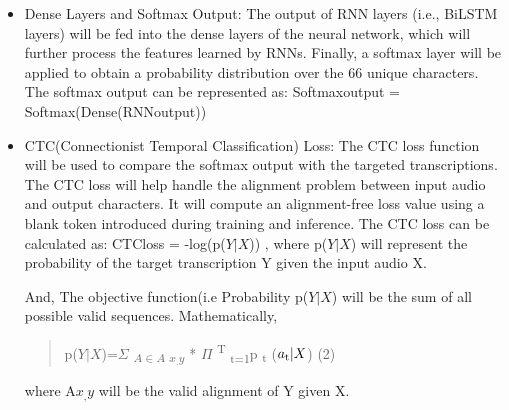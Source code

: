 \begin{enumerate}
\begin{itemize}
\item   Dense Layers and Softmax Output: The output of RNN layers (i.e., BiLSTM layers) will be fed into the dense layers of the neural network, which will further process the features learned by RNNs. Finally, a softmax layer will be applied to obtain a probability distribution over the 66 unique characters. The softmax output can be represented as:
Softmax\textunderscore output = Softmax(Dense(RNN\textunderscore output))
\item  CTC(Connectionist Temporal Classification) Loss: The CTC loss function will be used to compare the softmax output with the targeted transcriptions. The CTC loss will help handle the alignment problem between input audio and output characters. It will compute an alignment-free loss value using a blank token introduced during training and inference. The CTC loss can be calculated as:
CTC\textunderscore loss = -log(p($Y|X$))   , where p($Y|X$) will represent the probability of the target transcription Y given the input audio X.

And, The objective function(i.e Probability p($Y|X$) will be the sum of all possible valid sequences. 
Mathematically,  
\begin{quote}
                  \hspace{3cm}    p($Y|X$)=$\Sigma$ \textsubscript {$A \in A $ \(x_,y\)} * {$\Pi$ \textsuperscript T \textsubscript{t=1}}p \textsubscript{t} ($a \textsubscript{t}|X$) \hfill (2)
\end{quote}
where A\(x_,y\) will be the valid alignment of Y given X.
\end{itemize}




\end{enumerate}
